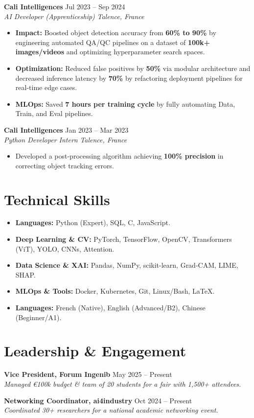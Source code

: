 \documentclass[10pt, letterpaper]{article}
\newcommand{\entry}[4]{
  \noindent \textbf{#1} \hfill #2 \\
  \textit{#3} \hfill \textit{#4} \par 
}
\begin{document}
\vspace{6pt}

\entry{Cali Intelligences}{Jul 2023 -- Sep 2024}{AI Developer (Apprenticeship)}{Talence, France}
\begin{itemize}
    \item \textbf{Impact:} Boosted object detection accuracy from \textbf{60\% to 90\%} by engineering automated QA/QC pipelines on a dataset of \textbf{100k+ images/videos} and optimizing hyperparameter search spaces.
    \item \textbf{Optimization:} Reduced false positives by \textbf{50\%} via modular architecture and decreased inference latency by \textbf{70\%} by refactoring deployment pipelines for real-time edge cases.
    \item \textbf{MLOps:} Saved \textbf{7 hours per training cycle} by fully automating Data, Train, and Eval pipelines.
\end{itemize}

\vspace{6pt}

\entry{Cali Intelligences}{Jan 2023 -- Mar 2023}{Python Developer Intern}{Talence, France}
\begin{itemize}
    \item Developed a post-processing algorithm achieving \textbf{100\% precision} in correcting object tracking errors.
\end{itemize}

\section{Technical Skills}
\begin{itemize}
    \item \textbf{Languages:} Python (Expert), SQL, C, JavaScript.
    \item \textbf{Deep Learning \& CV:} PyTorch, TensorFlow, OpenCV, Transformers (ViT), YOLO, CNNs, Attention.
    \item \textbf{Data Science \& XAI:} Pandas, NumPy, scikit-learn, Grad-CAM, LIME, SHAP.
    \item \textbf{MLOps \& Tools:} Docker, Kubernetes, Git, Linux/Bash, LaTeX.
    \item \textbf{Languages:} French (Native), English (Advanced/B2), Chinese (Beginner/A1).
\end{itemize}

\section{Leadership \& Engagement}

\entry{Vice President, Forum Ingenib}{May 2025 -- Present}{Managed €100k budget \& team of 20 students for a fair with 1,500+ attendees.}{}

\vspace{2pt}

\entry{Networking Coordinator, ai4industry}{Oct 2024 -- Present}{Coordinated 30+ researchers for a national academic networking event.}{}
\end{document}
